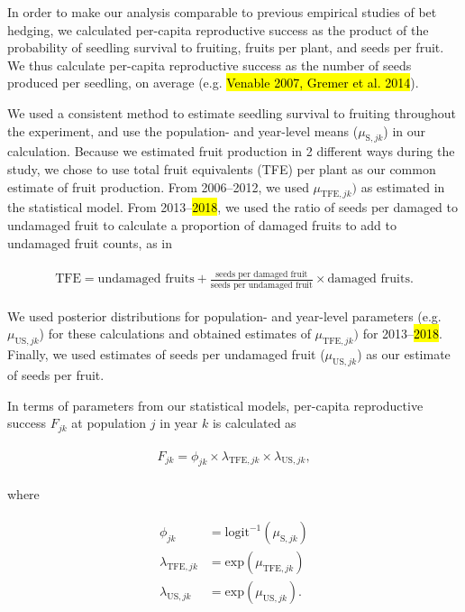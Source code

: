 \documentclass[12pt, oneside, titlepage]{article}   	%
\begin{document}
In order to make our analysis comparable to previous empirical studies of bet hedging, we calculated per-capita reproductive success as the product of the probability of seedling survival to fruiting, fruits per plant, and seeds per fruit. We thus calculate per-capita reproductive success as the number of seeds produced per seedling, on average (e.g. \hl{Venable 2007, Gremer et al. 2014}). 

We used a consistent method to estimate seedling survival to fruiting throughout the experiment, and use the population- and year-level means ($\mu_{\mathrm{S},jk}$) in our calculation. Because we estimated fruit production in 2 different ways during the study, we chose to use total fruit equivalents (TFE) per plant as our common estimate of fruit production. From 2006--2012, we used $\mu_{\mathrm{TFE},jk})$ as estimated in the statistical model. From 2013--\hl{2018}, we used the ratio of seeds per damaged to undamaged fruit to calculate a proportion of damaged fruits to add to undamaged fruit counts, as in 

\begin{align}
\begin{split}
\textrm{TFE} = \textrm{undamaged fruits} + \frac{\textrm{seeds per damaged fruit}}{\textrm{seeds per undamaged fruit}}\times  \textrm{damaged fruits} .
  \end{split}
\end{align}

We used posterior distributions for population- and year-level parameters (e.g. $\mu_{\mathrm{US},jk}$) for these calculations and obtained estimates of $\mu_{\mathrm{TFE},jk})$ for 2013--\hl{2018}. Finally, we used estimates of seeds per undamaged fruit ($\mu_{\mathrm{US},jk}$) as our estimate of seeds per fruit.

In terms of parameters from our statistical models, per-capita reproductive success $F_{jk}$ at population $j$ in year $k$ is calculated as

\begin{align}
  \begin{split}
F_{jk} = \phi_{jk} \times \lambda_{\mathrm{TFE},jk} \times \lambda_{\mathrm{US},jk}, \label{eq:percapitars}
  \end{split}
\end{align}

where

\begin{align}
  \begin{split}
\phi_{jk} & = \mathrm{logit}^{-1}(\mu_{\mathrm{S},jk}) \\
\lambda_{\mathrm{TFE},jk} & = \mathrm{exp}(\mu_{\mathrm{TFE},jk}) \\
\lambda_{\mathrm{US},jk} & = \mathrm{exp}(\mu_{\mathrm{US},jk}). 
  \end{split}
\end{align}
\end{document}
